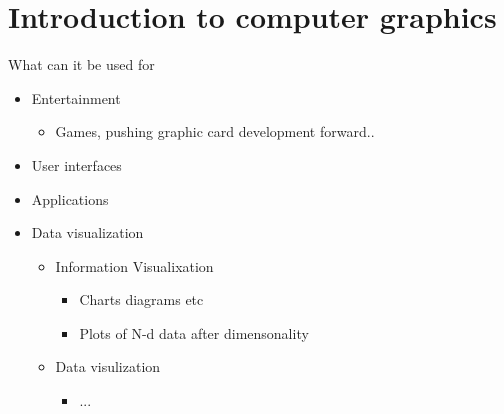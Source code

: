 
\section{Introduction to computer graphics}
What can it be used for

\begin{itemize}
	\item Entertainment
	\begin{itemize}
		\item Games, pushing graphic card development forward.. 
	\end{itemize}
	\item User interfaces
	\item Applications
	\item Data visualization
	\begin{itemize}
		\item Information Visualixation
		\begin{itemize}
			\item Charts diagrams etc
			\item Plots of N-d data after dimensonality
		\end{itemize}
		\item Data visulization
		\begin{itemize}
			\item ... 
		\end{itemize}


\end{itemize}
\end{itemize}
